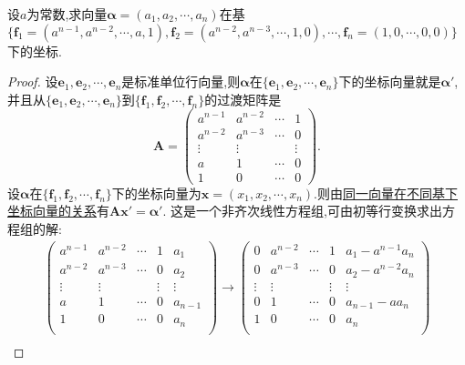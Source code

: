 \documentclass[../../main.tex]{subfiles}
\begin{document}
\begin{example}
设\(a\)为常数,求向量\(\boldsymbol{\alpha}=(a_1,a_2,\cdots,a_n)\)在基\(\{\boldsymbol{f}_1=(a^{n - 1},a^{n - 2},\cdots,a,1),\boldsymbol{f}_2=(a^{n - 2},a^{n - 3},\cdots,1,0),\cdots,\boldsymbol{f}_n=(1,0,\cdots,0,0)\}\)下的坐标.
\end{example}
\begin{proof}
设\(\boldsymbol{e}_1,\boldsymbol{e}_2,\cdots,\boldsymbol{e}_n\)是标准单位行向量,则\(\boldsymbol{\alpha}\)在\(\{\boldsymbol{e}_1,\boldsymbol{e}_2,\cdots,\boldsymbol{e}_n\}\)下的坐标向量就是$\boldsymbol{\alpha}'$,并且从\(\{\boldsymbol{e}_1,\boldsymbol{e}_2,\cdots,\boldsymbol{e}_n\}\)到\(\{\boldsymbol{f}_1,\boldsymbol{f}_2,\cdots,\boldsymbol{f}_n\}\)的过渡矩阵是
\[
\boldsymbol{A}=\begin{pmatrix}
a^{n - 1}&a^{n - 2}&\cdots&1\\
a^{n - 2}&a^{n - 3}&\cdots&0\\
\vdots&\vdots&&\vdots\\
a&1&\cdots&0\\
1&0&\cdots&0
\end{pmatrix}.
\]
设\(\boldsymbol{\alpha}\)在\(\{\boldsymbol{f}_1,\boldsymbol{f}_2,\cdots,\boldsymbol{f}_n\}\)下的坐标向量为\(\boldsymbol{x}=(x_1,x_2,\cdots,x_n)\).则由\hyperref[theorem:同一向量在不同基下坐标向量的关系]{同一向量在不同基下坐标向量的关系}有\(\boldsymbol{A}\boldsymbol{x}'=\boldsymbol{\alpha}'\). 这是一个非齐次线性方程组,可由初等行变换求出方程组的解:
\begin{gather*}
\left( \begin{matrix}
a^{n-1}&		a^{n-2}&		\cdots&		1&		a_1\\
a^{n-2}&		a^{n-3}&		\cdots&		0&		a_2\\
\vdots&		\vdots&		&		\vdots&		\vdots\\
a&		1&		\cdots&		0&		a_{n-1}\\
1&		0&		\cdots&		0&		a_n\\
\end{matrix} \right) \rightarrow \left( \begin{matrix}
0&		a^{n-2}&		\cdots&		1&		a_1-a^{n-1}a_n\\
0&		a^{n-3}&		\cdots&		0&		a_2-a^{n-2}a_n\\
\vdots&		\vdots&		&		\vdots&		\vdots\\
0&		1&		\cdots&		0&		a_{n-1}-aa_n\\
1&		0&		\cdots&		0&		a_n\\
\end{matrix} \right) 
\\

\end{gather*}
\end{proof}
\end{document}
